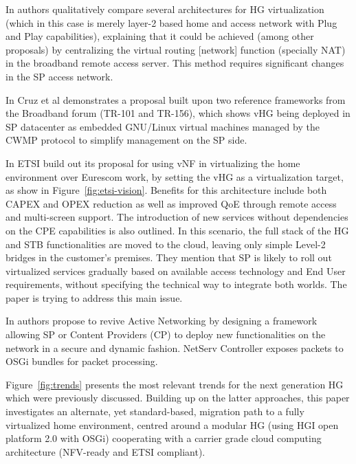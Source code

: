 In \cite{da_silva_home_2011} authors qualitatively compare several architectures for HG virtualization (which in this case is merely layer-2 based home and access network with Plug and Play capabilities), explaining that it could be achieved (among other proposals) by centralizing the virtual routing [network] function (specially NAT) in the broadband remote access server.
This method requires significant changes in the SP access network.

In \cite{cruz_architecture_2013} Cruz et al demonstrates a proposal built upon two reference frameworks from the Broadband forum (TR-101 and TR-156), which shows vHG being deployed in SP datacenter as embedded GNU/Linux virtual machines managed by the CWMP protocol to simplify management on the SP side.

In \cite{_network_2013} ETSI build out its proposal for using vNF in virtualizing the home environment over Eurescom work, by setting the vHG as a virtualization target, as show in Figure~\ref{fig:etsi-vision}.
Benefits for this architecture include both CAPEX and OPEX reduction as well as improved QoE through remote access and multi-screen support.
The introduction of new services without dependencies on the CPE capabilities is also outlined.
In this scenario, the full stack of the HG and STB functionalities are moved to the cloud, leaving only simple Level-2 bridges in the customer's premises.
They mention that SP is likely to roll out virtualized services gradually based on available access technology and End User requirements, without specifying the technical way to integrate both worlds.
The paper is trying to address this main issue.

In \cite{lee_netserv:_2011} authors propose to revive Active Networking by designing a framework allowing SP or Content Providers (CP) to deploy new functionalities on the network in a secure and dynamic fashion.
NetServ Controller exposes packets to OSGi bundles for packet processing.

Figure~\ref{fig:trends} presents the most relevant trends for the next generation HG which were previously discussed.
Building up on the latter approaches, this paper investigates an alternate, yet standard-based, migration path to a fully virtualized home environment, centred around a modular HG (using HGI open platform 2.0 with OSGi) cooperating with a carrier grade cloud computing architecture (NFV-ready and ETSI compliant).




